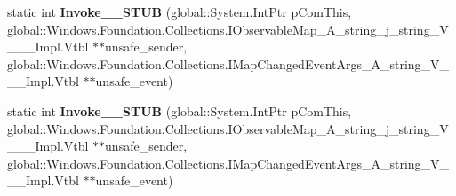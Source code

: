\begin{DoxyCompactItemize}
\item 
\mbox{\label{struct_windows_1_1_foundation_1_1_collections_1_1_map_changed_event_handler___a__string__j__string___v_______impl_1_1_vtbl_a8b35fa2f78ae2572b5c40854f4f64d5e}} 
static int {\bfseries Invoke\+\_\+\+\_\+\+S\+T\+UB} (global\+::\+System.\+Int\+Ptr p\+Com\+This, global\+::\+Windows.\+Foundation.\+Collections.\+I\+Observable\+Map\+\_\+\+A\+\_\+string\+\_\+j\+\_\+string\+\_\+\+V\+\_\+\+\_\+\+\_\+\+Impl.\+Vtbl $\ast$$\ast$unsafe\+\_\+sender, global\+::\+Windows.\+Foundation.\+Collections.\+I\+Map\+Changed\+Event\+Args\+\_\+\+A\+\_\+string\+\_\+\+V\+\_\+\+\_\+\+\_\+\+Impl.\+Vtbl $\ast$$\ast$unsafe\+\_\+event)
\item 
\mbox{\label{struct_windows_1_1_foundation_1_1_collections_1_1_map_changed_event_handler___a__string__j__string___v_______impl_1_1_vtbl_a8b35fa2f78ae2572b5c40854f4f64d5e}} 
static int {\bfseries Invoke\+\_\+\+\_\+\+S\+T\+UB} (global\+::\+System.\+Int\+Ptr p\+Com\+This, global\+::\+Windows.\+Foundation.\+Collections.\+I\+Observable\+Map\+\_\+\+A\+\_\+string\+\_\+j\+\_\+string\+\_\+\+V\+\_\+\+\_\+\+\_\+\+Impl.\+Vtbl $\ast$$\ast$unsafe\+\_\+sender, global\+::\+Windows.\+Foundation.\+Collections.\+I\+Map\+Changed\+Event\+Args\+\_\+\+A\+\_\+string\+\_\+\+V\+\_\+\+\_\+\+\_\+\+Impl.\+Vtbl $\ast$$\ast$unsafe\+\_\+event)
\end{DoxyCompactItemize}
